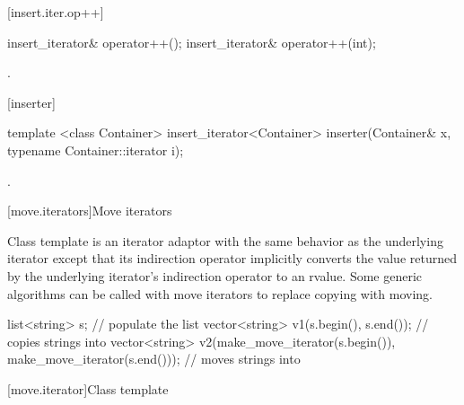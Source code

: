 [insert.iter.op++]{}

%
\begin{itemdecl}
insert_iterator& operator++();
insert_iterator& operator++(int);
\end{itemdecl}

\begin{itemdescr}
\pnum
\returns
{}.
\end{itemdescr}

[inserter]{}

%
\begin{itemdecl}
template <class Container>
  insert_iterator<Container> inserter(Container& x, typename Container::iterator i);
\end{itemdecl}

\begin{itemdescr}
\pnum
\returns
{}.
\end{itemdescr}

[move.iterators]{Move iterators}

\pnum
Class template  is an iterator adaptor
with the same behavior as the underlying iterator except that its
indirection operator implicitly converts the value returned by the
underlying iterator's indirection operator to an rvalue.
Some generic algorithms can be called with move iterators to replace
copying with moving.

\pnum
\enterexample

\begin{codeblock}
list<string> s;
// populate the list 
vector<string> v1(s.begin(), s.end());          // copies strings into 
vector<string> v2(make_move_iterator(s.begin()),
                  make_move_iterator(s.end())); // moves strings into 
\end{codeblock}

\exitexample

[move.iterator]{Class template }

